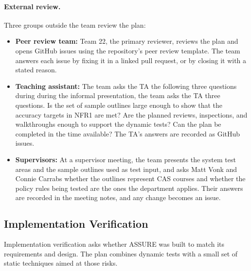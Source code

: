 \documentclass[12pt, titlepage]{article}
\begin{document}
\paragraph{External review.}
Three groups outside the team review the plan:
\begin{itemize}
    \item \textbf{Peer review team:} Team 22, the primary reviewer, reviews the
    plan and opens GitHub issues using the repository's peer review template.
    The team answers each issue by fixing it in a linked pull request, or by
    closing it with a stated reason.
    \item \textbf{Teaching assistant:} The team asks the TA the following three
    questions during during the informal presentation, the team asks the TA three
    questions. Is the set of sample outlines large enough to show that the accuracy
    targets in NFR1 are met? Are the planned reviews, inspections, and walkthroughs
    enough to support the dynamic tests? Can the plan be completed in the time
    available? The TA's answers are recorded as GitHub issues.
    \item \textbf{Supervisors:} At a supervisor meeting, the team presents the
    system test areas and the sample outlines used as test input, and asks Matt
    Vonk and Connie Carrabs whether the outlines represent CAS courses and
    whether the policy rules being tested are the ones the department applies.
    Their answers are recorded in the meeting notes, and any change becomes an
    issue.
\end{itemize}

\subsection{Implementation Verification}

Implementation verification asks whether ASSURE was built to match its requirements and design. The plan combines dynamic tests with a small set of static techniques aimed at those risks.
\end{document}
